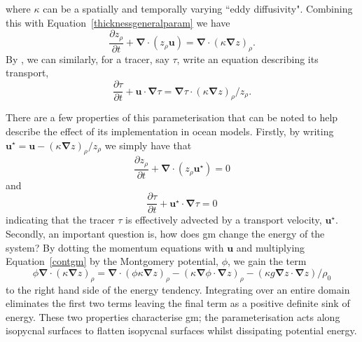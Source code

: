 \documentclass[12pt,a4paper]{report}
\newcommand*\equref[1]{Equation~\eqref{#1}}
\begin{document}
    where $\kappa$ can be a
     spatially and temporally varying ``eddy diffusivity". Combining this with  \equref{thicknessgeneralparam} we have
          \begin{equation}
          \frac{\partial z_{\rho}}{\partial t} + \boldsymbol{\nabla}\cdot\left(z_{\rho}\boldsymbol{u}\right) = \boldsymbol{\nabla}\cdot\left(\kappa
              \boldsymbol{\nabla} z \right)_{\rho} .
              \label{contgm}
          \end{equation}
    By \cite{gent1995parameterizing}, we can similarly, for a tracer, say $\tau$, write an equation
    describing its transport,
            \begin{equation}
              \frac{\partial \tau}{\partial t} +
                \boldsymbol{u}
              \cdot\boldsymbol{\nabla}\tau = \boldsymbol{\nabla}\tau\cdot
              \left(\kappa \boldsymbol{\nabla} z \right)_{\rho}/z_{\rho} .
            \end{equation}
            
    There are a few properties of this parameterisation that can be 
    noted to help describe the effect of its implementation in
    ocean models. Firstly, by writing $\boldsymbol{u}^{\star} = \boldsymbol{u} -
    \left(\kappa \boldsymbol{\nabla} z \right)_{\rho}/z_{\rho}$ we 
    simply have that 
    \begin{equation}
    \frac{\partial z_{\rho}}{\partial t} + \boldsymbol{\nabla}\cdot\left(z_{\rho}\boldsymbol{u}^{\star}\right) = 0
    \end{equation}
     and
     \begin{equation}
     \frac{\partial \tau}{\partial t} + \boldsymbol{u}^{\star}\cdot\boldsymbol{\nabla}\tau = 0
     \end{equation} 
      indicating
    that the tracer $\tau$ is effectively advected by a transport velocity, 
     $\boldsymbol{u}^{\star}$. Secondly, an important 
    question is, how does \gls{gm} change the energy of the system? 
    By dotting the momentum equations with $\boldsymbol{u}$ and
    multiplying \equref{contgm} by the Montgomery potential, $\phi$,
    we gain the term
    \begin{equation}
    \phi \boldsymbol{\nabla}\cdot\left(\kappa
                      \boldsymbol{\nabla} z \right)_{\rho} 
                      = \boldsymbol{\nabla}\cdot\left(\phi\kappa
                           \boldsymbol{\nabla} z \right)_{\rho} 
                      -\left(\kappa
                  \boldsymbol{\nabla}\phi\cdot \boldsymbol{\nabla} z \right)_{\rho} 
                                    -\left(\kappa g
                                \boldsymbol{\nabla}z\cdot \boldsymbol{\nabla} z \right)/{\rho_{0}} 
    \end{equation} 
     to the right hand side of the energy tendency. Integrating over an entire domain
                eliminates the first two terms leaving the final term
                as a positive definite sink of energy. These two 
                properties characterise \gls{gm}; the parameterisation
                acts along isopycnal surfaces to flatten isopycnal 
                surfaces whilst dissipating potential energy.
                
\end{document}
